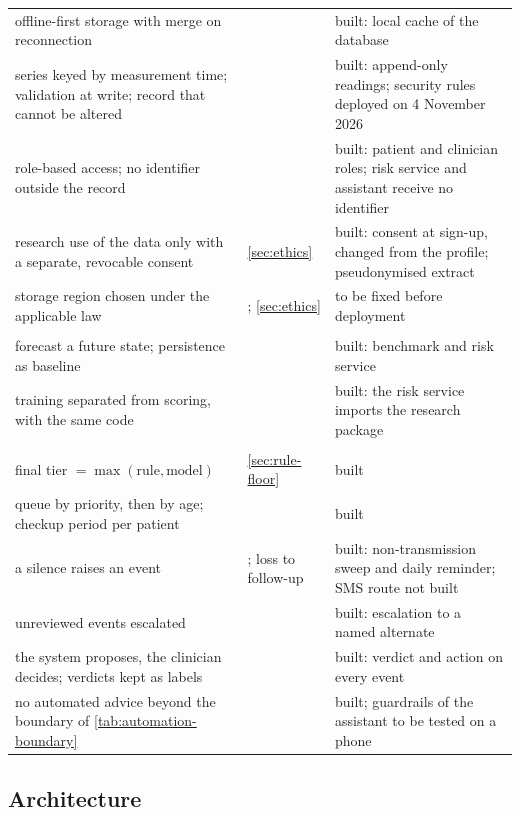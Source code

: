{\begin{longtable}{@{}>{\raggedright\arraybackslash}p{4.9cm} >{\raggedright\arraybackslash}p{3.2cm} >{\raggedright\arraybackslash}p{5.5cm}@{}}
offline-first storage with merge on reconnection & \textcite{efendi2025} & built: local cache of the database \\
series keyed by measurement time; validation at write; record that cannot be altered & \textcite{liu2025review} & built: append-only readings; security rules deployed on 4 November 2026 \\
role-based access; no identifier outside the record & \textcite{alhammad2024} & built: patient and clinician roles; risk service and assistant receive no identifier \\
research use of the data only with a separate, revocable consent & \cref{sec:ethics} & built: consent at sign-up, changed from the profile; pseudonymised extract \\
storage region chosen under the applicable law & \textcite{alhammad2024}; \cref{sec:ethics} & to be fixed before deployment \\
\addlinespace
\multicolumn{3}{@{}l}{\textit{Modelling}} \\
forecast a future state; persistence as baseline & \textcite{efendi2025,mendoza2025} & built: benchmark and risk service \\
training separated from scoring, with the same code & \textcite{liu2025review} & built: the risk service imports the research package \\
\addlinespace
\multicolumn{3}{@{}l}{\textit{Decision support}} \\
final tier $= \max(\text{rule}, \text{model})$ & \cref{sec:rule-floor} & built \\
queue by priority, then by age; checkup period per patient & \textcite{yazdani2018} & built \\
a silence raises an event & \textcite{yazdani2018}; loss to follow-up & built: non-transmission sweep and daily reminder; SMS route not built \\
unreviewed events escalated & \textcite{mucchi2021} & built: escalation to a named alternate \\
the system proposes, the clinician decides; verdicts kept as labels & \textcite{yazdani2018,mihevc2025} & built: verdict and action on every event \\
no automated advice beyond the boundary of \cref{tab:automation-boundary} & \textcite{mihevc2025} & built; guardrails of the assistant to be tested on a phone \\
\bottomrule
\end{longtable}}

\subsection{Architecture}\label{sec:layers}

